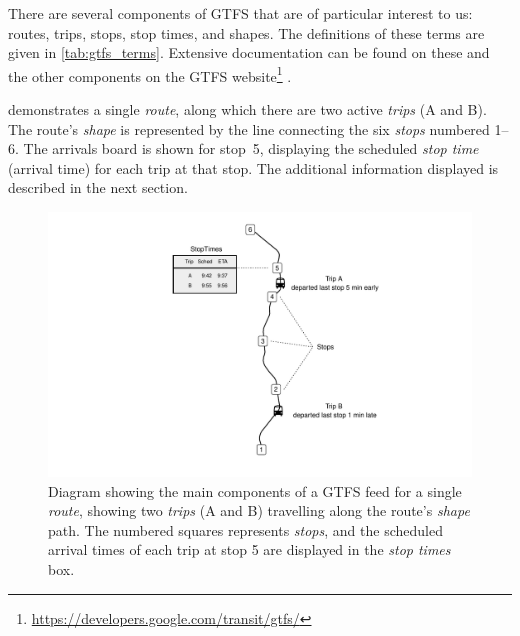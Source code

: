 There are several components of GTFS that are of particular interest to us: routes, trips, stops, stop times, and shapes. The definitions of these terms are given in \cref{tab:gtfs_terms}. Extensive documentation can be found on these and the other components on the GTFS website\footnote{\url{https://developers.google.com/transit/gtfs/}} \citep{GoogleDevelopers_2006}.


 demonstrates a single \emph{route}, along which there are two active \emph{trips} (A and B). The route's \emph{shape} is represented by the line connecting the six \emph{stops} numbered 1--6. The \rt{} arrivals board is shown for stop~5, displaying the scheduled \emph{stop time} (arrival time) for each trip at that stop. The additional information displayed is described in the next section.



\begin{knitrout}\small
{}\color{fgcolor}\begin{figure}

{\centering \includegraphics[width=\textwidth]{figure/gtfs_nw-1} 

}

\caption[Diagram of the main components of a GTFS feed]{Diagram showing the main components of a GTFS feed for a single \emph{route}, showing two \emph{trips} (A and B) travelling along the route's \emph{shape} path. The numbered squares represents \emph{stops}, and the scheduled arrival times of each trip at stop 5 are displayed in the \emph{stop times} box.}\label{fig:gtfs_nw}
\end{figure}


\end{knitrout}

